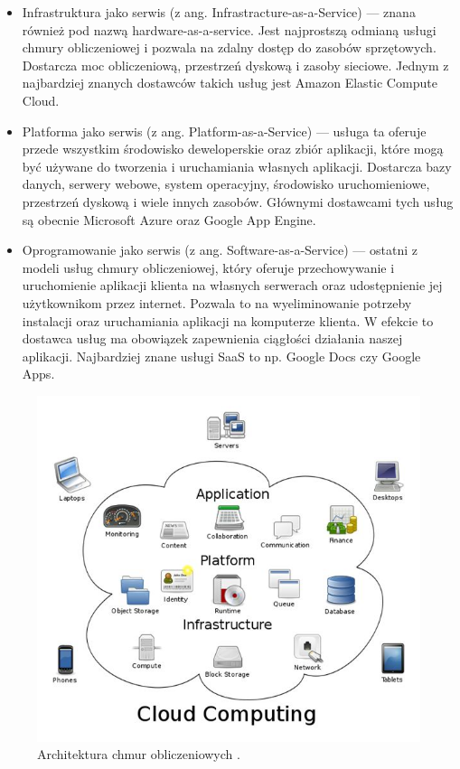 \documentclass[12pt]{report}
\begin{document}
\begin{itemize}
\item Infrastruktura jako serwis (z ang. Infrastracture-as-a-Service) --- znana również pod nazwą hardware-as-a-service. Jest najprostszą odmianą usługi chmu\-ry obliczeniowej i pozwala na zdalny dostęp do zasobów sprzętowych. Dostarcza moc obliczeniową, przestrzeń dyskową i zasoby sieciowe. Jednym z najbardziej znanych dostawców takich usług jest Amazon Elastic Compute Cloud.
\item Platforma jako serwis (z ang. Platform-as-a-Service) --- usługa ta oferuje przede wszystkim środowisko deweloperskie oraz zbiór aplikacji, które mogą być używane do tworzenia i uruchamiania własnych aplikacji. Dostarcza bazy danych, serwery webowe, system operacyjny, środowisko uruchomieniowe, przestrzeń dyskową i wiele innych zasobów. Głównymi dostawcami tych usług są obecnie Microsoft Azure oraz Google App Engine.
\item Oprogramowanie jako serwis (z ang. Software-as-a-Service) --- ostatni z modeli usług chmury obliczeniowej, który oferuje przechowywanie i uruchomienie aplikacji klienta na własnych serwerach oraz udostępnienie jej użytkownikom przez internet. Pozwala to na wyeliminowanie potrzeby instalacji oraz uruchamiania aplikacji na komputerze klienta. W efekcie to dostawca usług ma obowiązek zapewnienia ciągłości działania naszej aplikacji. Najbardziej znane usługi SaaS to np. Google Docs czy Google Apps.
\end{itemize}

\begin{figure}[h]
	\centering
	\includegraphics[width=1\textwidth]{images/cloudarchitecture.jpg}
	\caption{Architektura chmur obliczeniowych \cite{cloudArchImg}.}
\end{figure}
\end{document}
